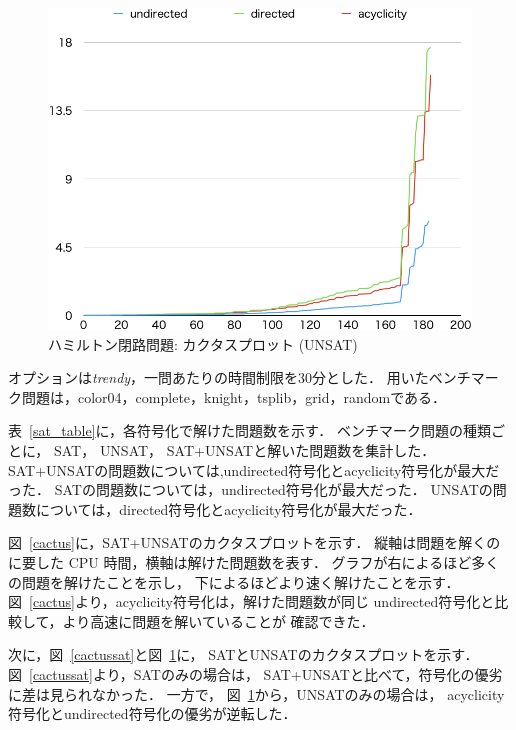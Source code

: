 \begin{figure}[tb]
\begin{center}
\includegraphics[width=0.6\linewidth]{fig/cactusunsat.png}
\caption{ハミルトン閉路問題: カクタスプロット (\textsf{UNSAT})}
\label{cactusunsat}
\end{center}
\end{figure}

オプションは\textit{trendy}，一問あたりの時間制限を30分とした．
用いたベンチマーク問題は，\textsf{color04}，\textsf{complete}，\textsf{knight}，\textsf{tsplib}，\textsf{grid}，\textsf{random}である．

表~\ref{sat_table}に，各符号化で解けた問題数を示す．
ベンチマーク問題の種類ごとに，
\textsf{SAT}，
\textsf{UNSAT}，
\textsf{SAT+UNSAT}と解いた問題数を集計した．
\textsf{SAT+UNSAT}の問題数については,\textsf{undirected}符号化と\textsf{acyclicity}符号化が最大だった．
\textsf{SAT}の問題数については，\textsf{undirected}符号化が最大だった．
\textsf{UNSAT}の問題数については，\textsf{directed}符号化と\textsf{acyclicity}符号化が最大だった．

図~\ref{cactus}に，\textsf{SAT+UNSAT}のカクタスプロットを示す．
縦軸は問題を解くのに要した CPU 時間，横軸は解けた問題数を表す．
グラフが右によるほど多くの問題を解けたことを示し，
下によるほどより速く解けたことを示す．
図~\ref{cactus}より，\textsf{acyclicity}符号化は，解けた問題数が同じ
\textsf{undirected}符号化と比較して，より高速に問題を解いていることが
確認できた．

次に，図~\ref{cactussat}と図~\ref{cactusunsat}に，
\textsf{SAT}と\textsf{UNSAT}のカクタスプロットを示す．
図~\ref{cactussat}より，\textsf{SAT}のみの場合は，
\textsf{SAT+UNSAT}と比べて，符号化の優劣に差は見られなかった．
一方で，
図~\ref{cactusunsat}から，\textsf{UNSAT}のみの場合は，
\textsf{acyclicity}符号化と\textsf{undirected}符号化の優劣が逆転した．

